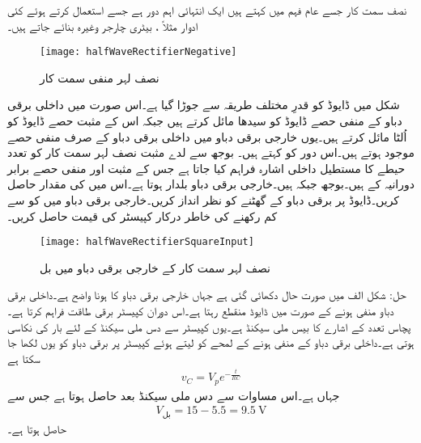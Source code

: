 نصف سمت کار جسے عام فہم میں  کہتے ہیں ایک انتہائی اہم دور ہے جسے استعمال کرتے ہوئے کئی ادوار مثلاً   ، بیٹری چارجر وغیرہ بنائے جاتے ہیں۔
\begin{figure}
\centering
\texttt{[image: halfWaveRectifierNegative]}
\caption{نصف لہر منفی سمت کار}
\label{شکل_نصف_لہر_منفی_سمت_کار}
\end{figure}
شکل  میں ڈایوڈ کو قدرِ مختلف طریقہ سے جوڑا گیا ہے۔اس صورت میں داخلی برقی دباو  کے منفی حصے ڈایوڈ کو سیدھا مائل کرتے ہیں جبکہ اس کے مثبت حصے ڈایوڈ کو اُلٹا مائل کرتے ہیں۔یوں خارجی برقی دباو میں داخلی برقی دباو کے صرف منفی حصے موجود ہوتے ہیں۔اس دور کو  کہتے ہیں۔
بوجھ سے لدے مثبت نصف لہر سمت کار کو  تعدد  حیطے کا مستطیل داخلی اشارہ فراہم کیا جاتا ہے جس کے مثبت اور منفی حصے برابر دورانیہ کے ہیں۔بوجھ  جبکہ  ہیں۔خارجی برقی دباو بلدار ہوتا ہے۔اس میں  کی مقدار حاصل کریں۔ڈایوڈ پر برقی دباو کے گھٹنے کو نظر انداز کریں۔خارجی برقی دباو میں  کو  سے کم رکھنے کی خاطر درکار کپیسٹر کی قیمت حاصل کریں۔
\begin{figure}
\centering
\texttt{[image: halfWaveRectifierSquareInput]}
\caption{نصف لہر سمت کار کے خارجی برقی دباو میں بل}
\label{شکل_نصف_لہر_سمتکار_بل}
\end{figure}
حل:
شکل  الف میں صورت حال دکھائی گئی ہے جہاں خارجی برقی دباو کا  ہونا واضح ہے۔داخلی برقی دباو منفی ہونے کے صورت میں ڈایوڈ منقطع رہتا ہے۔اس دوران کپیسٹر  برقی طاقت فراہم کرتا ہے۔پچاس تعدد کے اشارے کا  بیس ملی سیکنڈ ہے۔یوں کپیسٹر سے دس ملی سیکنڈ کے لئے بار کی نکاسی ہوتی ہے۔داخلی برقی دباو کے منفی ہونے کے لمحے کو  لیتے ہوئے کپیسٹر پر برقی دباو  کو یوں لکھا جا سکتا ہے
\begin{align*}
v_C=V_p e^{-\frac{t}{RC}}
\end{align*}
جہاں  ہے۔اس مساوات سے دس ملی سیکنڈ بعد  حاصل ہوتا ہے جس سے
\begin{align*}
V_{\textrm{بل}}=15-5.5=\SI{9.5}{\volt}
\end{align*}
حاصل ہوتا ہے۔

